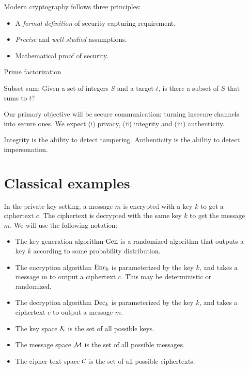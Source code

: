 Modern cryptography follows three principles:
\begin{itemize}
    \item A \emph{formal definition} of security capturing requirement.
    \item \emph{Precise} and \emph{well-studied} assumptions.
    \item Mathematical proof of security.
\end{itemize}

\begin{examples}
    \item Prime factorization
    \item Subset sum: Given a set of integers $S$ and a target $t$,
        is there a subset of $S$ that sums to $t$?
\end{examples}

Our primary objective will be secure communication:
turning insecure channels into secure ones.
We expect (i) privacy, (ii) integrity and (iii) authenticity.

Integrity is the ability to detect tampering.
Authenticity is the ability to detect impersonation.

\section{Classical examples} \label{sec:classical-examples}
In the private key setting, a message $m$ is encrypted with a key $k$
to get a ciphertext $c$.
The ciphertext is decrypted with the same key $k$ to get the message $m$.
We will use the following notation:
\begin{itemize}
    \item The key-generation algorithm $\operatorname{Gen}$ is a randomized algorithm
        that outputs a key $k$ according to some probability distribution.
    \item The encryption algorithm $\operatorname{Enc}_k$ is parameterized by the key $k$,
        and takes a message $m$ to output a ciphertext $c$.
        This may be deterministic or randomized.
    \item The decryption algorithm $\operatorname{Dec}_k$ is parameterized by the key $k$,
        and takes a ciphertext $c$ to output a message $m$.
    \item The key space $\mathcal{K}$ is the set of all possible keys.
    \item The message space $\mathcal{M}$ is the set of all possible messages.
    \item The cipher-text space $\mathcal{C}$ is the set of all possible
        ciphertexts.
\end{itemize}

